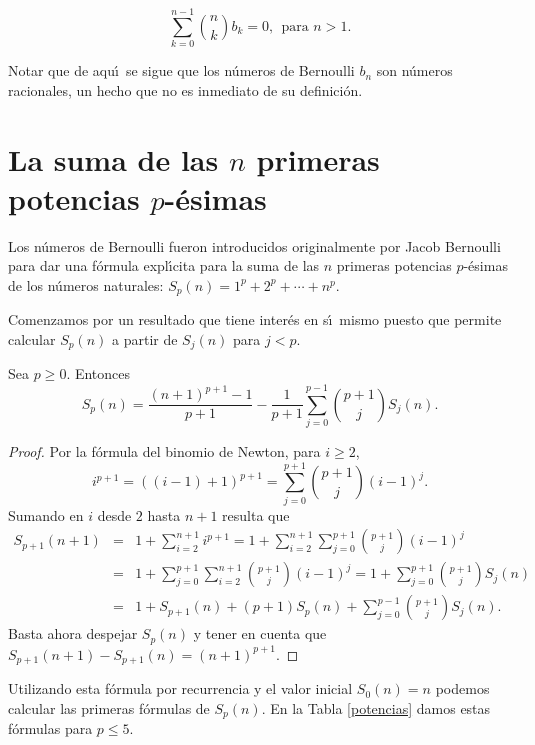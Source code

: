 \begin{equation}\label{RecurrenciaBernoulli}\sum_{k=0}^{n-1}{n\choose k}b_k=0,\ \ \text{para } n>1.\end{equation}

Notar que de aqu\'\i\ se sigue que los n\'umeros de Bernoulli $b_n$ son n\'umeros racionales, un hecho que no es inmediato de su definici\'on.

\section{La suma de las $n$ primeras potencias $p$-\'esimas}

Los n\'umeros de Bernoulli fueron introducidos originalmente por Jacob Bernoulli para dar una f\'ormula expl\'\i cita para la suma de las $n$ primeras potencias $p$-\'esimas de los n\'umeros naturales: $S_p(n)=1^p+2^p+\cdots +n^p$.

Comenzamos por un  resultado que tiene inter\'es en s\'\i\ mismo puesto que permite calcular $S_p(n)$ a partir de $S_j(n)$ para $j<p$.

\begin{proposition}\label{RecurrenciaSumaPotencias} Sea $p\geq 0$. Entonces
$$S_p(n)=\frac{(n+1)^{p+1}-1}{p+1}-\frac{1}{p+1}\sum_{j=0}^{p-1}{p+1\choose j}S_j(n).$$
\end{proposition}

\begin{proof}
Por la f\'ormula del binomio de Newton, para $i\geq 2$,
$$i^{p+1}=((i-1)+1)^{p+1}=\sum_{j=0}^{p+1}{p+1\choose j}(i-1)^j.$$
Sumando en $i$ desde $2$ hasta $n+1$ resulta que
\begin{eqnarray*}
S_{p+1}(n+1) &=& 1+\sum_{i=2}^{n+1}i^{p+1}=1+\sum_{i=2}^{n+1}\sum _{j=0}^{p+1}{p+1\choose j}(i-1)^j\\  &=& 1+\sum_{j=0}^{p+1}\sum_{i=2}^{n+1}{p+1\choose j}(i-1)^ j= 1+\sum_{j=0}^{p+1}{p+1\choose j}S_j(n)\\ &=& 1+S_{p+1}(n)+(p+1)S_p(n)+\sum_{j=0}^{p-1}{p+1\choose j}S_j(n).\end{eqnarray*}
Basta ahora despejar $S_p(n)$ y tener en cuenta que $S_{p+1}(n+1)-S_{p+1}(n)=(n+1)^{p+1}$.
\end{proof}

Utilizando esta f\'ormula por recurrencia y el valor inicial $S_0(n)=n$ podemos calcular las primeras f\'ormulas de $S_p(n)$. En la Tabla \ref{potencias} damos estas f\'ormulas para $p\leq 5$.


